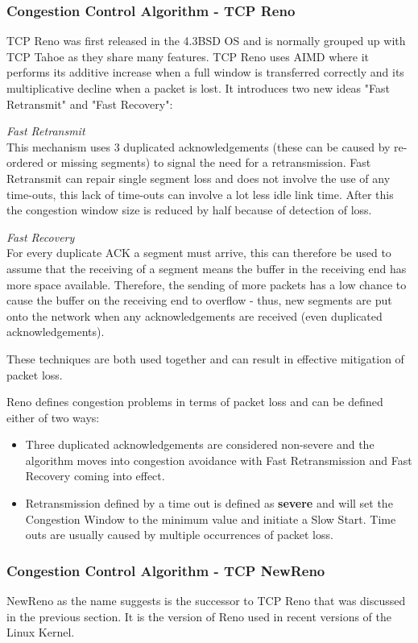 \subsubsection*{Congestion Control Algorithm - TCP Reno}
TCP Reno was first released in the 4.3BSD OS and is normally grouped up with TCP Tahoe as they share many features. TCP Reno uses AIMD  where it performs its additive increase when a full window is transferred correctly and its multiplicative decline when a packet is lost. It introduces two new ideas "Fast Retransmit" and "Fast Recovery":

{\it Fast Retransmit}\\
This mechanism uses 3 duplicated acknowledgements (these can be caused by re-ordered or missing segments) to signal the need for a retransmission. Fast Retransmit can repair single segment loss and does not involve the use of any time-outs, this lack of time-outs can involve a lot less idle link time. After this the congestion window size is reduced by half because of detection of loss.

{\it Fast Recovery}\\
For every duplicate ACK a segment must arrive, this can therefore be used to assume that the receiving of a segment means the buffer in the receiving end has more space available. Therefore, the sending of more packets has a low chance to cause the buffer on the receiving end to overflow - thus, new segments are put onto the network when any acknowledgements are received (even duplicated acknowledgements). 

These techniques are both used together and can result in effective mitigation of packet loss.

Reno defines congestion problems in terms of packet loss and can be defined either of two ways:

\begin{itemize}
	\item Three duplicated acknowledgements are considered non-severe and the algorithm moves into congestion avoidance with Fast Retransmission and Fast Recovery coming into effect.
	\item Retransmission defined by a time out is defined as {\bf severe} and will set the Congestion Window to the minimum value and initiate a Slow Start. Time outs are usually caused by multiple occurrences of packet loss.
\end{itemize}

\subsubsection*{Congestion Control Algorithm - TCP NewReno}
NewReno \citep{newReno} as the name suggests is the successor to TCP Reno that was discussed in the previous section. It is the version of Reno used in recent versions of the Linux Kernel.

